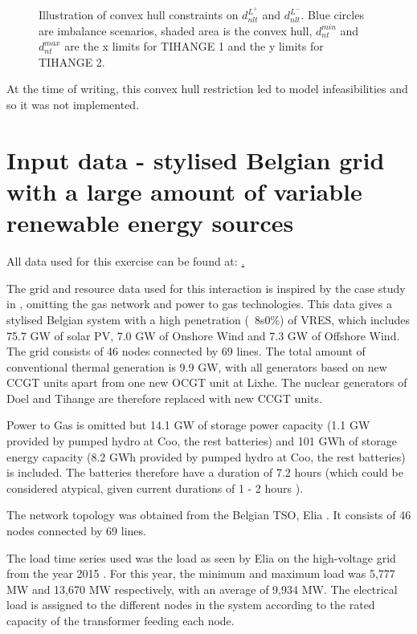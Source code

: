 \documentclass[number,times]{elsarticle}
\begin{document}
\begin{figure}[ht]
    \centering
    \caption{Illustration of convex hull constraints on $d_{nlt}^{L^+}$ and $d_{nlt}^{L^-}$. Blue circles are imbalance scenarios, shaded area is the convex hull, $d_{nt}^{min}$ and $d_{nt}^{max}$ are the x limits for TIHANGE 1 and the y limits for TIHANGE 2. \label{fig:convex_hull_tihange}}
\end{figure}

At the time of writing, this convex hull restriction led to model infeasibilities and so it was not implemented.

\section{Input data - stylised Belgian grid with a large amount of variable renewable energy sources} \label{sec:data}

All data used for this exercise can be found at: \href{https://www.dropbox.com/sh/mdvmc082gwng0tr/AABRyc3fZpxAFycmUfZmh8Csa?dl=0}.

The grid and resource data used for this interaction is inspired by the case study in \cite{Belderbos2020}, omitting the gas network and power to gas technologies. This data gives a stylised Belgian system with a high penetration (~8s0\%) of \ac{VRES}, which includes 75.7 GW of solar PV, 7.0 GW of Onshore Wind and 7.3 GW of Offshore Wind. The grid consists of 46 nodes connected by 69 lines. The total amount of conventional thermal generation is 9.9 GW, with all generators based on new \ac{CCGT} units apart from one new \ac{OCGT} unit at Lixhe. The nuclear generators of Doel and Tihange are therefore replaced with new \ac{CCGT} units.

Power to Gas is omitted but 14.1 GW of storage power capacity (1.1 GW provided by pumped hydro at Coo, the rest batteries) and 101 GWh of storage energy capacity (8.2 GWh provided by pumped hydro at Coo, the rest batteries) is included. The batteries therefore have a duration of 7.2 hours (which could be considered atypical, given current durations of 1 - 2 hours ).

The network topology was obtained from the Belgian TSO, Elia \cite{Elia2018grid}. It consists of 46 nodes connected by 69 lines.

The load time series used was the load as seen by Elia on the high-voltage grid from the year 2015 . For this year, the minimum and maximum load was 5,777 MW and 13,670 MW respectively, with an average of 9,934 MW. The electrical load is assigned to the different nodes in the system according to the rated capacity of the transformer feeding each node.
\end{document}
